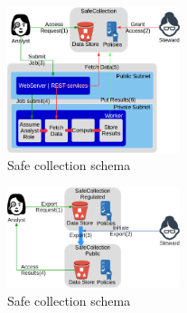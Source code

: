 \begin{figure}
  \center
  \includegraphics[width=0.45\textwidth]{figures/safe_flow.png}
  \caption{Safe collection schema}
  \label{fig:flow1}
  \vspace{-1.5em}
\end{figure}


\begin{figure}
  \center
  \includegraphics[width=0.45\textwidth]{figures/export_flow.png}
  \caption{Safe collection schema}
  \label{fig:flow2}
  \vspace{-1.5em}
\end{figure}









